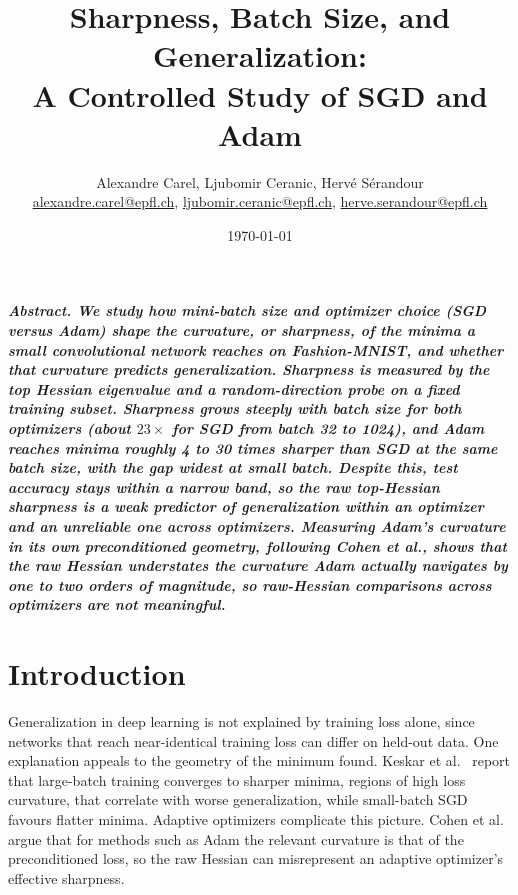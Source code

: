\documentclass[a4paper,10pt,twoside]{article}
\newcommand{\mail}[1]{{\href{mailto:#1}{#1}}}
\begin{document}
\title{Sharpness, Batch Size, and Generalization:\\ A Controlled Study of SGD and Adam}
\author{Alexandre Carel, Ljubomir Ceranic, Hervé Sérandour \\
{\small \mail{alexandre.carel@epfl.ch}, \mail{ljubomir.ceranic@epfl.ch}, \mail{herve.serandour@epfl.ch}}}
\date{\today}
\begin{titlepage}
  \thispagestyle{empty}
  \maketitle
\end{titlepage}
\twocolumn
\setcounter{page}{1}
\baselineskip=14pt
\parindent=0pt
\parskip=10pt

\textbf{\textit{Abstract. We study how mini-batch size and optimizer choice (SGD versus Adam) shape the curvature, or sharpness, of the minima a small convolutional network reaches on Fashion-MNIST, and whether that curvature predicts generalization. Sharpness is measured by the top Hessian eigenvalue and a random-direction probe on a fixed training subset. Sharpness grows steeply with batch size for both optimizers (about $23\times$ for SGD from batch 32 to 1024), and Adam reaches minima roughly 4 to 30 times sharper than SGD at the same batch size, with the gap widest at small batch. Despite this, test accuracy stays within a narrow band, so the raw top-Hessian sharpness is a weak predictor of generalization within an optimizer and an unreliable one across optimizers. Measuring Adam's curvature in its own preconditioned geometry, following Cohen et al., shows that the raw Hessian understates the curvature Adam actually navigates by one to two orders of magnitude, so raw-Hessian comparisons across optimizers are not meaningful.}}

\section{Introduction}
Generalization in deep learning is not explained by training loss alone, since networks that reach near-identical training loss can differ on held-out data. One explanation appeals to the geometry of the minimum found. Keskar et al.~\cite{keskar2017} report that large-batch training converges to sharper minima, regions of high loss curvature, that correlate with worse generalization, while small-batch SGD favours flatter minima. Adaptive optimizers complicate this picture. Cohen et al.~\cite{cohen2022} argue that for methods such as Adam the relevant curvature is that of the preconditioned loss, so the raw Hessian can misrepresent an adaptive optimizer's effective sharpness.
\end{document}
